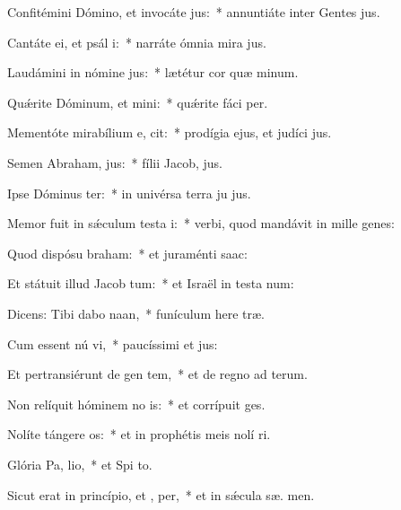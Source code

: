 \item Confitémini Dómino, et invocáte  jus:~* annuntiáte inter Gentes  jus.
\item Cantáte ei, et psál i:~* narráte ómnia mira jus.
\item Laudámini in nómine  jus:~* lætétur cor quæ minum.
\item Quǽrite Dóminum, et mini:~* quǽrite fáci  per.
\item Mementóte mirabílium e,  cit:~* prodígia ejus, et judíci  jus.
\item Semen Abraham,  jus:~* fílii Jacob,  jus.
\item Ipse Dóminus  ter:~* in univérsa terra ju jus.
\item Memor fuit in sǽculum testa i:~* verbi, quod mandávit in mille genes:
\item Quod dispósu  braham:~* et juraménti   saac:
\item Et státuit illud Jacob  tum:~* et Israël in testa num:
\item Dicens: Tibi dabo  naan,~* funículum here træ.
\item Cum essent nú vi,~* paucíssimi et  jus:
\item Et pertransiérunt de gen  tem,~* et de regno ad  terum.
\item Non relíquit hóminem no is:~* et corrípuit   ges.
\item Nolíte tángere  os:~* et in prophétis meis nolí ri.
\item Glória Pa,  lio,~* et Spi to.
\item Sicut erat in princípio, et ,  per,~* et in sǽcula sæ. men.
